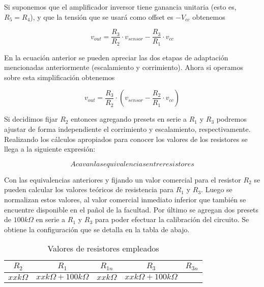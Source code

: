 Si suponemos que el amplificador inversor tiene ganancia unitaria (esto es, $R_5=R_4$), y que la tensión que se usará como offset es $-V_{cc}$ obtenemos

\begin{equation}
    v_{out}= \frac{R_3}{R_2} \cdot v_{sensor}  - \frac{R_3}{R_1} \cdot v_{cc} 
    \label{fig:EJ6_ecuacion_sistema2} 
\end{equation}

En la ecuación anterior se pueden apreciar las dos etapas de adaptación mencionadas anteriormente (escalamiento y corrimiento). Ahora si operamos sobre esta simplificación obtenemos

\begin{equation}
    v_{out}= \frac{R_3}{R_2} \cdot \left( v_{sensor} - \frac{R_2}{R_1} \cdot v_{cc} \right)
    \label{fig:EJ6_ecuacion_sistema_simplificada_final} 
\end{equation}

Si decidimos fijar $R_2$ entonces agregando presets en serie a $R_1$ y $R_3$ podremos ajustar de forma independiente el corrimiento y escalamiento, respectivamente.
Realizando los c\'alculos apropiados para conocer los valores de los resistores se llega a la siguiente expresi\'on:

\begin{equation}
    Aca van las equivalencias entre resistores
    \label{fig:EJ6_ecuacion_resistores}
\end{equation}

Con las equivalencias anteriores y fijando un valor comercial para el resistor $R_2$ se pueden calcular los valores teóricos de resistencia para $R_1$ y $R_3$.
  Luego se normalizan estos valores, al valor comercial inmediato inferior que tambi\'en se encuentre disponible en el pa\~nol de la facultad.
  Por \'ultimo se agregan dos presets de $100k\Omega$ en serie a $R_1$ y $R_3$ para poder efectuar la calibraci\'on del circuito. Se obtiene la configuraci\'on que se detalla en la tabla de abajo.

  \begin{table}[H]
	\begin{center}
		\begin{tabular}{c c c c c}
		$R_2$ & $R_1$ & $R_{1n}$ & $R_3$ & $R_{3n}$ \\
		\hline
		$xx k\Omega$ & $xx k\Omega + 100 k\Omega$ & $xx k\Omega$ & $xx k\Omega + 100 k\Omega$
		\end{tabular}
		
		\caption{Valores de resistores empleados}
	\end{center}
\end{table}


